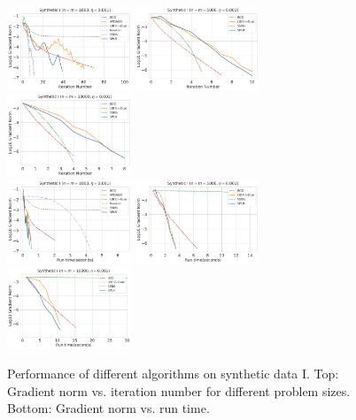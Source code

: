 \documentclass{article}
\theoremstyle{plain}
\theoremstyle{definition}
\theoremstyle{remark}
\begin{document}
\begin{figure}[p]
    \centering
    \includegraphics[width=0.33\textwidth]{save/Synthetic I/iterations/n=1000, m=1000, reg=0.001}
    \includegraphics[width=0.33\textwidth]{save/Synthetic I/iterations/n=5000, m=5000, reg=0.001}
    \includegraphics[width=0.33\textwidth]{save/Synthetic I/iterations/n=10000, m=10000, reg=0.001} \\
    \includegraphics[width=0.33\textwidth]{save/Synthetic I/run_times/n=1000, m=1000, reg=0.001}
    \includegraphics[width=0.33\textwidth]{save/Synthetic I/run_times/n=5000, m=5000, reg=0.001}
    \includegraphics[width=0.33\textwidth]{save/Synthetic I/run_times/n=10000, m=10000, reg=0.001}
    \caption{Performance of different algorithms on synthetic data I. Top: Gradient norm vs. iteration number for different problem sizes. Bottom: Gradient norm vs. run time.}
    \label{fig:synthetic_1}
\end{figure}
\end{document}
